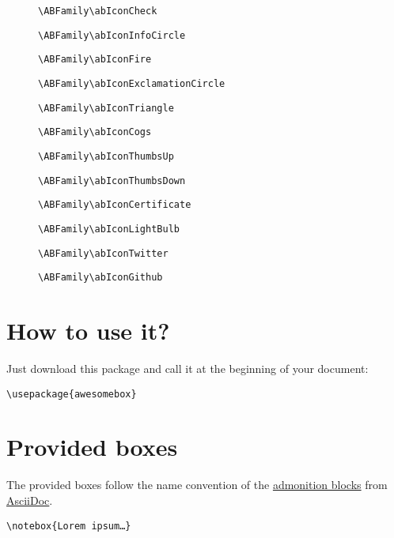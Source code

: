 \documentclass[a4paper,12pt]{article}
\newcommand\hrefcolor[2]{\textcolor{magenta}{\href{#1}{#2}}}
\begin{document}
\begin{description}
  \item[{\ABFamily\abIconCheck}] \verb!\ABFamily\abIconCheck!
  \item[{\ABFamily\abIconInfoCircle}] \verb!\ABFamily\abIconInfoCircle!
  \item[{\ABFamily\abIconFire}] \verb!\ABFamily\abIconFire!
  \item[{\ABFamily\abIconExclamationCircle}] \verb!\ABFamily\abIconExclamationCircle!
  \item[{\ABFamily\abIconExclamationTriangle}] \verb!\ABFamily\abIconTriangle!
  \item[{\ABFamily\abIconCogs}] \verb!\ABFamily\abIconCogs!
  \item[{\ABFamily\abIconThumbsUp}] \verb!\ABFamily\abIconThumbsUp!
  \item[{\ABFamily\abIconThumbsDown}] \verb!\ABFamily\abIconThumbsDown!
  \item[{\ABFamily\abIconCertificate}] \verb!\ABFamily\abIconCertificate!
  \item[{\ABFamily\abIconLightBulb}] \verb!\ABFamily\abIconLightBulb!
  \item[{\ABFamily\abIconTwitter}] \verb!\ABFamily\abIconTwitter!
  \item[{\ABFamily\abIconGithub}] \verb!\ABFamily\abIconGithub!
\end{description}

\section{How to use it?}

Just download this package and call it at the beginning of your
document:

\begin{center}
\verb!\usepackage{awesomebox}!
\end{center}

\section{Provided boxes}

The provided boxes follow the name convention of the
\hrefcolor{http://asciidoctor.org/docs/user-manual/\#admonition}{admonition
  blocks} from \hrefcolor{http://asciidoctor.org}{AsciiDoc}.

\begin{center}
\verb!\notebox{Lorem ipsum…}!
\end{center}
\end{document}
